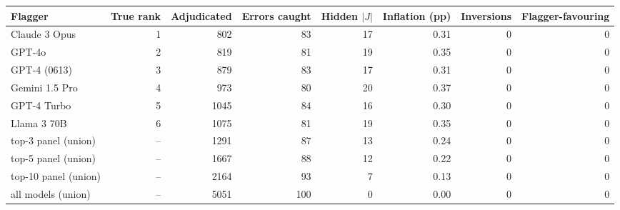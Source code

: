 \begin{tabular}{lrrrrrrr}
\toprule
Flagger & True rank & Adjudicated & Errors caught & Hidden $|J|$ & Inflation (pp) & Inversions & Flagger-favouring \\
\midrule
Claude 3 Opus & 1 & 802 & 83 & 17 & 0.31 & 0 & 0 \\
GPT-4o & 2 & 819 & 81 & 19 & 0.35 & 0 & 0 \\
GPT-4 (0613) & 3 & 879 & 83 & 17 & 0.31 & 0 & 0 \\
Gemini 1.5 Pro & 4 & 973 & 80 & 20 & 0.37 & 0 & 0 \\
GPT-4 Turbo & 5 & 1045 & 84 & 16 & 0.30 & 0 & 0 \\
Llama 3 70B & 6 & 1075 & 81 & 19 & 0.35 & 0 & 0 \\
\midrule
top-3 panel (union) & -- & 1291 & 87 & 13 & 0.24 & 0 & 0 \\
top-5 panel (union) & -- & 1667 & 88 & 12 & 0.22 & 0 & 0 \\
top-10 panel (union) & -- & 2164 & 93 & 7 & 0.13 & 0 & 0 \\
all models (union) & -- & 5051 & 100 & 0 & 0.00 & 0 & 0 \\
\bottomrule
\end{tabular}
